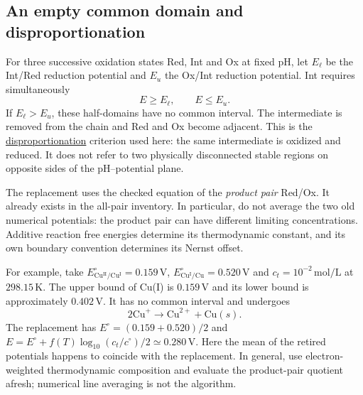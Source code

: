 \documentclass[a4paper,11pt]{ltxdoc}
\begin{document}
\subsection{An empty common domain and disproportionation}
For three successive oxidation states Red, Int and Ox at fixed pH, let
$E_\ell$ be the Int/Red reduction potential and $E_u$ the Ox/Int reduction
potential. Int requires simultaneously
\[
 E\ge E_\ell,\qquad E\le E_u.
\]
If $E_\ell>E_u$, these half-domains have no common interval. The intermediate
is removed from the chain and Red and Ox become adjacent. This is the
\href{https://goldbook.iupac.org/terms/view/D01799}{disproportionation}
criterion used here: the same intermediate is oxidized and reduced. It does not
refer to two physically disconnected stable regions on opposite sides of the
pH--potential plane.

The replacement uses the checked equation of the \emph{product pair} Red/Ox.
It already exists in the all-pair inventory. In particular, do not average the
two old numerical potentials: the product pair can have different limiting
concentrations. Additive reaction free energies determine its thermodynamic
constant, and its own boundary convention determines its Nernst offset.

For example, take $E^\circ_{\mathrm{Cu^{II}/Cu^I}}=0.159\,\mathrm V$,
$E^\circ_{\mathrm{Cu^I/Cu}}=0.520\,\mathrm V$ and
$c_t=10^{-2}\,\mathrm{mol/L}$ at $298.15\,\mathrm K$. The upper bound of Cu(I)
is $0.159\,\mathrm V$ and its lower bound is approximately $0.402\,\mathrm V$.
It has no common interval and undergoes
\[
 2\mathrm{Cu}^+\longrightarrow\mathrm{Cu}^{2+}+\mathrm{Cu}(s).
\]
The replacement has $E^\circ=(0.159+0.520)/2$ and
$E=E^\circ+f(T)\log_{10}(c_t/c^\circ)/2\simeq0.280\,\mathrm V$.
Here the mean of the retired potentials happens to coincide with the replacement.
In general, use electron-weighted thermodynamic composition and evaluate the
product-pair quotient afresh; numerical line averaging is not the algorithm.
\end{document}
